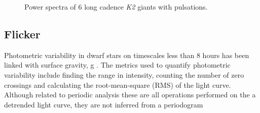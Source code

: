 \documentclass[useAMS, usenatbib]{aastex}
\begin{document}
\begin{figure}
\begin{center}
{        }
    \end{center}
    \caption{Power spectra of 6 long cadence {\it K2} giants with pulsations.
\label{fig:astero_examples}}
\end{figure}


\subsection{Flicker}
Photometric variability in dwarf stars on timescales less than 8 hours has been
linked with surface gravity, g \citep{Bastien2013}.
The metrics used to quantify photometric variability include finding the range
in intensity, counting the number of zero crossings and calculating the
root-mean-square (RMS) of the light curve.
Although related to periodic analysis these are all operations performed on the
a detrended light curve, they are not inferred from a periodogram
\end{document}

